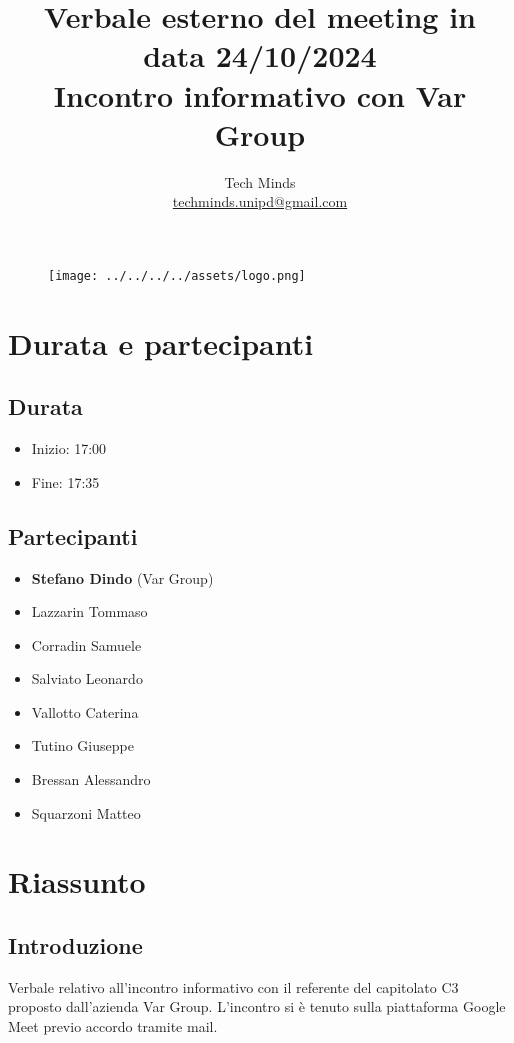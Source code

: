 \documentclass[10pt]{article}
\title{Verbale esterno del meeting in data 24/10/2024\\ \large{Incontro informativo con Var Group}}
\author{Tech Minds \\ \href{mailto:techminds.unipd@gmail.com}{techminds.unipd@gmail.com}}
\date{}
\begin{document}
\maketitle

\begin{figure}[h]
    \centering
    \texttt{[image: ../../../../assets/logo.png]}
\end{figure}

\tableofcontents{\newpage}

\section{Durata e partecipanti}
\subsection{Durata}
\begin{itemize}
  \item Inizio: 17:00
  \item Fine: 17:35
\end{itemize}
\subsection{Partecipanti}
\begin{itemize}
    \item \textbf{Stefano Dindo} (Var Group)
    \item Lazzarin Tommaso
    \item Corradin Samuele
    \item Salviato Leonardo
    \item Vallotto Caterina
    \item Tutino Giuseppe
    \item Bressan Alessandro
    \item Squarzoni Matteo
\end{itemize}

\section{Riassunto}
\subsection{Introduzione}
Verbale relativo all'incontro informativo con il referente del capitolato C3 proposto dall'azienda Var Group.
L'incontro si è tenuto sulla piattaforma Google Meet previo accordo tramite mail. \\
\end{document}

